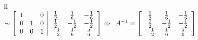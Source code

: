 \documentclass[11pt]{amsbook}
\begin{document}
\begin{tabular}{ll}
\\

{
	$\thicksim\left[\begin{array}{ccc|ccc}
	1 &  & 0  & \frac{1}{2} & \frac{1}{6} & -\frac{1}{6} \\
	0 & 1 & 0 & \frac{1}{2} & -\frac{1}{2} & -\frac{1}{2} \\
	0 & 0 & 1 & -\frac{1}{2} & \frac{1}{6} & \frac{5}{6}
	\end{array}\right]\Rightarrow\enspace
	A^{-1} =
	\left[\begin{array}{ccc}
	\frac{1}{2} & \frac{1}{6} & -\frac{1}{6} \\
	\frac{1}{2} & -\frac{1}{2} & -\frac{1}{2} \\
	-\frac{1}{2} & \frac{1}{6} & \frac{5}{6}
	\end{array}\right]$
	}

\end{tabular}

\end{document}
